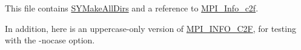 This file contains \href{http://www.mcs.anl.gov/petsc/file.html}{SYMakeAllDirs} and a reference to \href{http://www/info.html}{MPI_Info_c2f}.

In addition, here is an uppercase-only version of \href{http://www/info.html}{MPI_INFO_C2F}, for testing
with the -nocase option.
